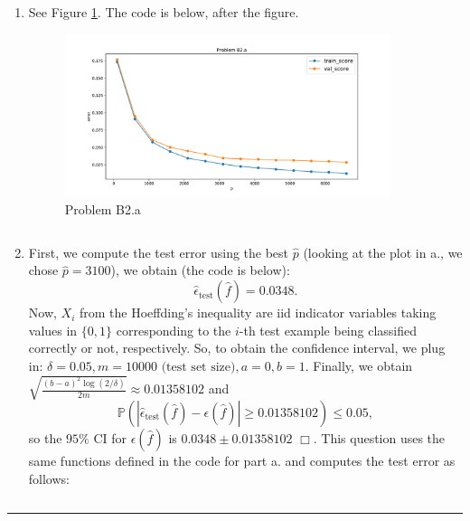 \documentclass{article}
\newcommand{\1}{\mathbf{1}}
\renewcommand{\P}{\mathbb{P}}
\begin{document}
\begin{enumerate}
    \item See Figure \ref{figure:b2.a}. The code is below, after the figure.
         \begin{figure}[h!]
            \centering
            \includegraphics[width=0.9\textwidth]{code/b2_a.pdf}
            \caption{Problem B2.a}
            \label{figure:b2.a}
         \end{figure}
         
         \inputminted{python}{code/B2_a.py}
          \caption{Code for B2.a}
          \label{listing:b2.a}
    \item First, we compute the test error using the best $\widehat p$ (looking at the plot in a., we chose $\widehat p = 3100$), we obtain (the code is below):
    $$
     \boxed{\widehat{\epsilon}_{\text{test}}(\widehat{f}) = 0.0348.}
    $$
    Now, $X_i$ from the Hoeffding's inequality are iid indicator variables taking values in $\{0,1\}$ corresponding to the $i$-th test example being classified correctly or not, respectively. So, to obtain the confidence interval, we plug in: $\delta = 0.05, m = 10000 \text{ (test set size)}, a=0, b=1$. Finally, we obtain $\sqrt{\frac{(b-a)^2 \log(2/\delta)}{2m}} \approx 0.01358102$ and
    $$
    \P \left( \left|\widehat{\epsilon}_{\text{test}}(\widehat{f})  - \epsilon(\widehat{f}) \right| \geq 0.01358102 \right)
                \leq 0.05,
    $$
    so the $95\%$ CI for $\epsilon(\widehat{f})$ is  $\boxed{0.0348 \pm 0.01358102}$ $\Box$.
    This question uses the same functions defined in the code for part a. and computes the test error as follows:
    \inputminted{python}{code/B2_b.py}
    
\end{enumerate}
\noindent\rule{\textwidth}{1pt}
\end{document}
